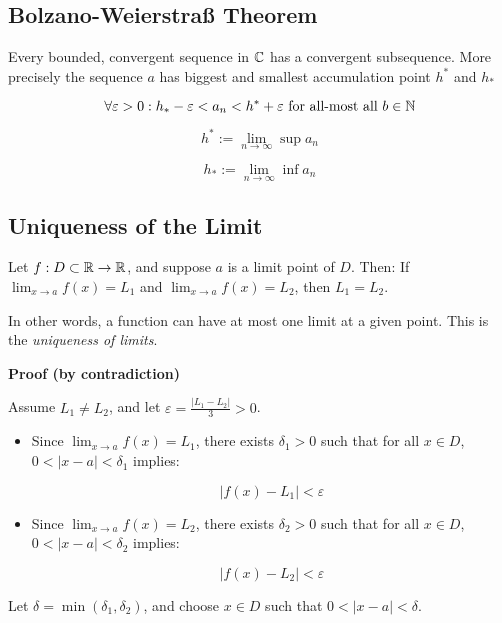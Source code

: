 \subsection{Bolzano-Weierstraß Theorem}

Every bounded, convergent sequence in \(\mathbb{C}\) has a convergent subsequence.
More precisely the sequence \(a\) has biggest and smallest accumulation point \(h^*\) and \(h_*\)

\[
    \forall \varepsilon > 0 : h_* - \varepsilon < a_n < h^{*} + \varepsilon \text{ for all-most all } 
    b \in \mathbb{N}
\]

\[
    h^* := \lim_{n \to \infty} \sup a_n
\]

\[
    h_* := \lim_{n \to \infty} \inf a_n
\]

\subsection{Uniqueness of the Limit}

Let \( f: D \subset \mathbb{R} \to \mathbb{R} \), and suppose \(a\) is a limit point of \( D \). Then:
If \( \lim_{x \to a} f(x) = L_1 \) and \( \lim_{x \to a} f(x) = L_2 \), then \( L_1 = L_2 \).

In other words, a function can have at most one limit at a given point. This is the \emph{uniqueness of limits}.

\textbf{Proof (by contradiction)}

Assume \( L_1 \ne L_2 \), and let \( \varepsilon = \frac{|L_1 - L_2|}{3} > 0 \).

\begin{itemize}

    \item Since \( \lim_{x \to a} f(x) = L_1 \), there exists \( \delta_1 > 0 \) such that for all \( x \in D \), \( 0 < |x - a| < \delta_1 \) implies:

    \[
        |f(x) - L_1| < \varepsilon
    \]
    
    \item Since \( \lim_{x \to a} f(x) = L_2 \), there exists \( \delta_2 > 0 \) such that for all \( x \in D \), \( 0 < |x - a| < \delta_2 \) implies:

    \[
        |f(x) - L_2| < \varepsilon
    \]

\end{itemize}

Let \( \delta = \min(\delta_1, \delta_2) \), and choose \( x \in D \) such that \( 0 < |x - a| < \delta \).

